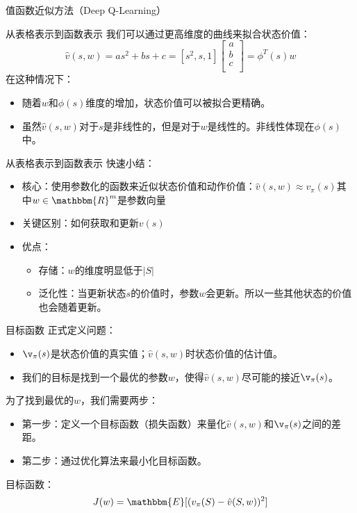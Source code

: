 \begin{section}{值函数近似方法\alert{（Deep Q-Learning）}}
\begin{frame}{从表格表示到函数表示}
   我们可以通过更高维度的曲线来拟合状态价值：
   \[
        \hat{v}(s,w)=as^2+bs+c=[s^2,s,1]\begin{bmatrix}
            a \\
            b \\
            c \\
        \end{bmatrix}=\phi^T(s)w
   \]
   在这种情况下：
   \begin{itemize}
    \item 随着$w$和$\phi(s)$维度的增加，状态价值可以被拟合更精确。
    \item 虽然$\hat{v}(s,w)$对于$s$是非线性的，但是对于$w$是线性的。非线性体现在$\phi(s)$中。
   \end{itemize}
\end{frame}

\begin{frame}{从表格表示到函数表示}
    快速小结：
    \begin{itemize}
     \item 核心：使用\alert{参数化的函数}来近似状态价值和动作价值：$\hat{v}(s,w)\approx v_\pi(s)$其中$w\in \mathbbm{R}^m$是参数向量
     \item 关键区别：如何获取和更新$v(s)$
     \item 优点：
    \begin{itemize}
        \item 存储：$w$的维度明显低于$|S|$
        \item 泛化性：当更新状态$s$的价值时，参数$w$会更新。所以一些其他状态的价值也会随着更新。
    \end{itemize}
    \end{itemize}
\end{frame}

\begin{frame}{目标函数}
    正式定义问题：
    \begin{itemize}
        \item $\v_\pi(s)$是状态价值的\alert{真实值}；$\hat{v}(s,w)$时状态价值的\alert{估计值}。
        \item 我们的目标是找到一个最优的参数$w$，使得$\hat{v}(s,w)$尽可能的接近$\v_\pi(s)$。
    \end{itemize}
    为了找到最优的$w$，我们需要两步：
    \begin{itemize}
        \item 第一步：定义一个目标函数（损失函数）来量化$\hat{v}(s,w)$和$\v_\pi(s)$之间的差距。
        \item 第二步：通过优化算法来最小化目标函数。
    \end{itemize}
    \alert{目标函数：
        \[
            J(w)=\mathbbm{E}[(v_\pi(S)-\hat{v}(S,w))^2]
        \]
    }
\end{frame}


\end{section}
